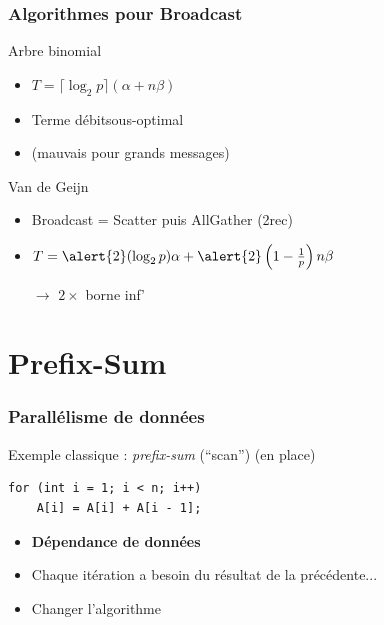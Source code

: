 \documentclass[xcolor={x11names,svgnames}]{beamer}
\begin{document}
\begin{frame}
\frametitle{Algorithmes pour Broadcast}

\begin{block}{Arbre binomial}
  \begin{itemize}
  \item $T = \lceil \log_2 p \rceil (\alpha + n \beta)$
  \item Terme \og débit\fg sous-optimal
  \item (mauvais pour grands messages)
  \end{itemize}
\end{block}

\bigskip

\begin{block}{Van de Geijn}
  \begin{itemize}
  \item Broadcast = Scatter puis AllGather (2rec)
  \item $T = \alert{2}  (\log_2 p) \alpha +  \alert{2} \left(1 - \frac{1}{p}\right) n \beta$
  \item[$\rightarrow$] $2\times$ borne inf'
  \end{itemize}
\end{block}
\end{frame}


\section{Prefix-Sum}

\begin{frame}[fragile]
\frametitle{Parallélisme de données}


\begin{block}{Exemple classique : \emph{prefix-sum} (``scan'') (en place)}
\begin{verbatim}
for (int i = 1; i < n; i++)
    A[i] = A[i] + A[i - 1];
\end{verbatim}
\end{block}

\bigskip

\begin{itemize}
\item \textbf{Dépendance de données}
\item Chaque itération a besoin du résultat de la précédente...
\item Changer l'algorithme   
\end{itemize}
\end{frame}
\end{document}
